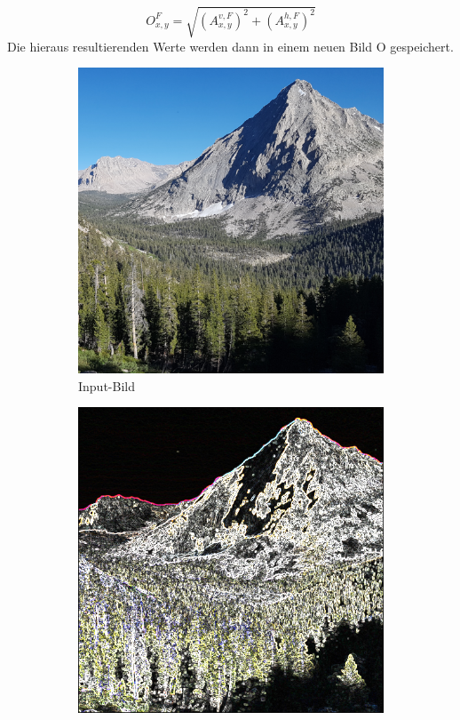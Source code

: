 \documentclass[course=erap]{aspdoc}
\begin{document}
\begin{equation}
    O^{F}_{x,y} = \sqrt{(A^{v,F}_{x,y})^2 + (A^{h,F}_{x,y})^2}
    \label{eq:wurzel}
\end{equation}
Die hieraus resultierenden Werte werden dann in einem neuen Bild O gespeichert.
\begin{figure}[H]
    \begin{subfigure}{.5\columnwidth}
        \centering
        \includegraphics[width=\columnwidth]{graphics/johnmuirtrail}
        \caption{Input-Bild}
        \label{fig:input-bild}
    \end{subfigure}
    \begin{subfigure}{.5\columnwidth}
        \centering
        \includegraphics[width=\columnwidth]{graphics/johnmuirtrail_sobel}

\end{subfigure}
\end{figure}
\end{document}
